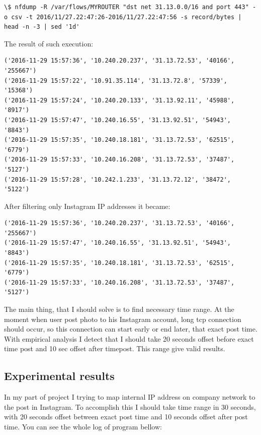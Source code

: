 \begin{lstlisting}
\$ nfdump -R /var/flows/MYROUTER "dst net 31.13.0.0/16 and port 443" -o csv -t 2016/11/27.22:47:26-2016/11/27.22:47:56 -s record/bytes | head -n -3 | sed '1d'
\end{lstlisting}

The result of such execution:

\begin{lstlisting}
('2016-11-29 15:57:36', '10.240.20.237', '31.13.72.53', '40166', '255667')
('2016-11-29 15:57:22', '10.91.35.114', '31.13.72.8', '57339', '15368')
('2016-11-29 15:57:24', '10.240.20.133', '31.13.92.11', '45988', '8917')
('2016-11-29 15:57:47', '10.240.16.55', '31.13.92.51', '54943', '8843')
('2016-11-29 15:57:35', '10.240.18.181', '31.13.72.53', '62515', '6779')
('2016-11-29 15:57:33', '10.240.16.208', '31.13.72.53', '37487', '5127')
('2016-11-29 15:57:28', '10.242.1.233', '31.13.72.12', '38472', '5122')
\end{lstlisting}

After filtering only Instagram IP addresses it became:

\begin{lstlisting}
('2016-11-29 15:57:36', '10.240.20.237', '31.13.72.53', '40166', '255667')
('2016-11-29 15:57:47', '10.240.16.55', '31.13.92.51', '54943', '8843')
('2016-11-29 15:57:35', '10.240.18.181', '31.13.72.53', '62515', '6779')
('2016-11-29 15:57:33', '10.240.16.208', '31.13.72.53', '37487', '5127')
\end{lstlisting}

The main thing, that I should solve is to find necessary time range. At the moment when user post photo to his Instagram account, long tcp connection should occur, so this connection can start early or end later, that exact post time. With empirical analysis I detect that I should take 20 seconds offset before exact time post and 10 sec offset after timepost. This range give valid results.

\subsection{Experimental results}
In my part of project I trying to map internal IP address on company network to the post in Instagram. To accomplish this I should take time range in 30 seconds, with 20 seconds offset between exact post time and 10 seconds offset after post time. You can see the whole log of program bellow:

